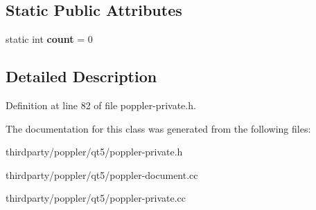 \subsection*{Static Public Attributes}
\begin{DoxyCompactItemize}
\item 
\mbox{\label{class_poppler_1_1_document_data_a1380946395beecf657765f8b5d4ba348}} 
static int {\bfseries count} = 0
\end{DoxyCompactItemize}


\subsection{Detailed Description}


Definition at line 82 of file poppler-\/private.\+h.



The documentation for this class was generated from the following files\+:\begin{DoxyCompactItemize}
\item 
thirdparty/poppler/qt5/poppler-\/private.\+h\item 
thirdparty/poppler/qt5/poppler-\/document.\+cc\item 
thirdparty/poppler/qt5/poppler-\/private.\+cc\end{DoxyCompactItemize}
